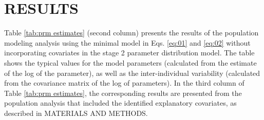 \documentclass[utf8]{frontiersSCNS} %
\begin{document}
\section{RESULTS}
Table \ref{tab:prm estimates} (second column) presents the results of the population modeling analysis using the minimal model in Eqs. \ref{eq:01} and \ref{eq:02} without incorporating covariates in the stage 2 parameter distribution model. The table shows the typical values for the model parameters (calculated from the estimate of the log of the parameter), as well as the inter-individual variability (calculated from the covariance matrix of the log of parameters). In the third column of Table \ref{tab:prm estimates}, the corresponding results are presented from the population analysis that included the identified explanatory covariates, as described in MATERIALS AND METHODS.
\end{document}
